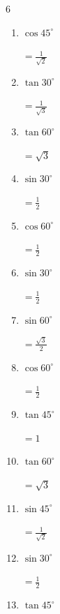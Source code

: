 \begin{multicols}{6}
\begin{enumerate}
        $\displaystyle =\sqrt{3}$

  \item $\displaystyle \cos{45^\circ}$

        $\displaystyle =\frac{1}{\sqrt{2}}$

  \item $\displaystyle \tan{30^\circ}$

        $\displaystyle =\frac{1}{\sqrt{3}}$

  \item $\displaystyle \tan{60^\circ}$

        $\displaystyle =\sqrt{3}$

  \item $\displaystyle \sin{30^\circ}$

        $\displaystyle =\frac{1}{2}$

  \item $\displaystyle \cos{60^\circ}$

        $\displaystyle =\frac{1}{2}$

\columnbreak %

  \item $\displaystyle \sin{30^\circ}$

        $\displaystyle =\frac{1}{2}$

  \item $\displaystyle \sin{60^\circ}$

        $\displaystyle =\frac{\sqrt{3}}{2}$

  \item $\displaystyle \cos{60^\circ}$

        $\displaystyle =\frac{1}{2}$

  \item $\displaystyle \tan{45^\circ}$

        $\displaystyle =1$

  \item $\displaystyle \tan{60^\circ}$

        $\displaystyle =\sqrt{3}$

  \item $\displaystyle \sin{45^\circ}$

        $\displaystyle =\frac{1}{\sqrt{2}}$

  \item $\displaystyle \sin{30^\circ}$

        $\displaystyle =\frac{1}{2}$

  \item $\displaystyle \tan{45^\circ}$


\end{enumerate}
\end{multicols}
